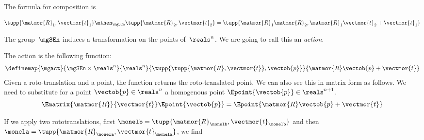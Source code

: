 The formula for composition is

\begin{equation}
  \tupp{\matmor{R}_1, \vectmor{t}_1} \mthen_{\mgSEn} \tupp{\matmor{R}_2, \vectmor{t}_2}  = \tupp{\matmor{R}_1 \matmor{R}_2, \matmor{R}_1 \vectmor{t}_2 + \vectmor{t}_1}
\end{equation}

%

The group~$\mgSEn$ induces a transformation on the points of~$\reals^n$.
We are going to call this an \emph{action}.

The action is the following function:
% 
\begin{equation}\label{eq:apply}
\definemap{\mgact}{\mgSEn \times \reals^n}{\reals^n}{\tupp{ \tupp{\matmor{R}, \vectmor{t}}, \vectob{p}}}{\matmor{R}\vectob{p} + \vectmor{t}}
\end{equation}
Given a roto-translation and a point, the function returns the roto-translated point.
%
We can also see this in matrix form as follows. We need to substitute for a point $\vectob{p} \in \reals^n$ a homogenous point
$ \Epoint{\vectob{p}} \in \reals^{n+1}$.
%
\begin{equation}\label{eq:homogenous}
\Ematrix{\matmor{R}}{\vectmor{t}}
\Epoint{\vectob{p}}
 =
 \Epoint{\matmor{R}\vectob{p} + \vectmor{t}}
\end{equation}



If we apply two rototranslations, first $\monelb=\tupp{\matmor{R}_{\monelb}, \vectmor{t}_{\monelb}}$ and then $\monela=\tupp{\matmor{R}_{\monela}, \vectmor{t}_{\monela}}$, we find
%

